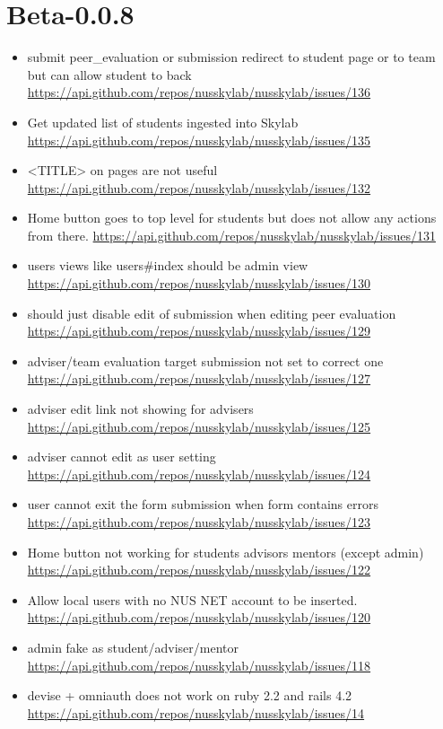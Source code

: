 {\section{Beta-0.0.8}
\begin{itemize}[noitemsep]
    \item submit peer\_evaluation or submission redirect to student page or to team but can allow student to back \url{https://api.github.com/repos/nusskylab/nusskylab/issues/136} 
    \item Get updated list of students ingested into Skylab \url{https://api.github.com/repos/nusskylab/nusskylab/issues/135} 
    \item <TITLE> on pages are not useful \url{https://api.github.com/repos/nusskylab/nusskylab/issues/132} 
    \item Home button goes to top level for students but does not allow any actions from there. \url{https://api.github.com/repos/nusskylab/nusskylab/issues/131} 
    \item users views like users\#index should be admin view \url{https://api.github.com/repos/nusskylab/nusskylab/issues/130} 
    \item should just disable edit of submission when editing peer evaluation \url{https://api.github.com/repos/nusskylab/nusskylab/issues/129} 
    \item adviser/team evaluation target submission not set to correct one \url{https://api.github.com/repos/nusskylab/nusskylab/issues/127} 
    \item adviser edit link not showing for advisers \url{https://api.github.com/repos/nusskylab/nusskylab/issues/125} 
    \item adviser cannot edit as user setting \url{https://api.github.com/repos/nusskylab/nusskylab/issues/124} 
    \item user cannot exit the form submission when form contains errors \url{https://api.github.com/repos/nusskylab/nusskylab/issues/123} 
    \item Home button not working for students  advisors  mentors (except admin) \url{https://api.github.com/repos/nusskylab/nusskylab/issues/122} 
    \item Allow local users with no NUS NET account to be inserted.  \url{https://api.github.com/repos/nusskylab/nusskylab/issues/120} 
    \item admin fake as student/adviser/mentor \url{https://api.github.com/repos/nusskylab/nusskylab/issues/118} 
    \item devise + omniauth does not work on ruby 2.2 and rails 4.2 \url{https://api.github.com/repos/nusskylab/nusskylab/issues/14} 
\end{itemize}

}

